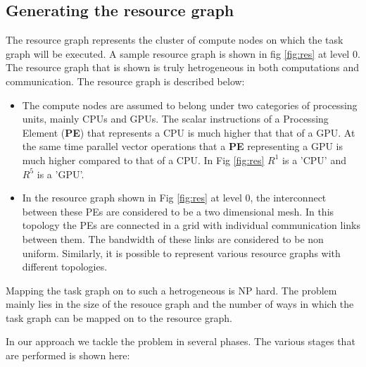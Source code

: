 \subsection{Generating the resource graph}
\label{sec:gener-reso-graph}

The resource graph represents the cluster of compute nodes on which
the task graph will be executed. A sample resource graph is shown in
fig \ref{fig:res} at level 0. The resource graph that is shown is truly
hetrogeneous in both computations and communication. The resource
graph is described below:

\begin{itemize}

\item The compute nodes are assumed to belong under two categories of
processing units, mainly CPUs and GPUs. The scalar instructions of a
Processing Element (\textbf{PE}) that represents a CPU is much higher
that that of a GPU. At the same time parallel vector operations that a
\textbf{PE} representing a GPU is much higher compared to that of a
CPU. In Fig \ref{fig:res} $ R^1 $ is a 'CPU' and $ R^5 $ is a 'GPU'.

\item In the resource graph shown in Fig \ref{fig:res} at level 0, the
interconnect between these PEs are considered to be a two dimensional
mesh. In this topology the PEs are connected in a grid with individual
communication links between them. The bandwidth of these links are
considered to be non uniform. Similarly, it is possible to represent
various resource graphs with different topologies.

\end{itemize}

Mapping the task graph on to such a hetrogeneous is NP hard. The
problem mainly lies in the size of the resouce graph and the number of
ways in which the task graph can be mapped on to the resource graph.

In our approach we tackle the problem in several phases. The various
stages that are performed is shown here:

